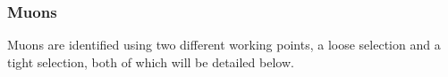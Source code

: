 
\subsubsection{Muons \label{sec:object_muon}}

Muons are identified using two different working points, a loose selection and a tight selection,
both of which will be detailed below. 



